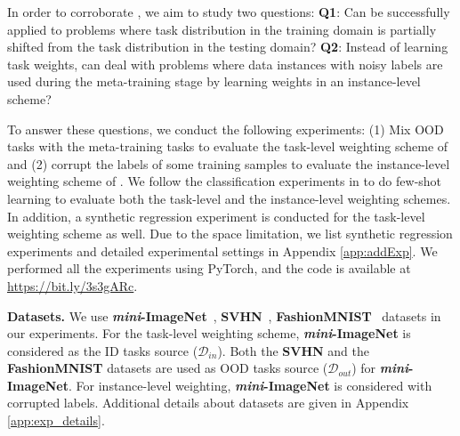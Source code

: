 In order to corroborate \sysname{}, we aim to study two questions:
\textbf{Q1}: Can \sysname{} be successfully applied to problems where task distribution in the training domain is partially shifted from the task distribution in the testing domain?
\textbf{Q2}: Instead of learning task weights, can \sysname{} deal with problems where data instances with noisy labels are used during the meta-training stage by learning weights in an instance-level scheme?


To answer these questions, we conduct the following experiments: (1) Mix OOD tasks with the meta-training tasks to evaluate the task-level weighting scheme of \sysname{} and (2) corrupt the labels of some training samples to evaluate the instance-level weighting scheme of \sysname{}. We follow the classification experiments in \cite{finn2017model} to do few-shot learning to evaluate both the task-level and the instance-level weighting schemes. In addition, a synthetic regression experiment is conducted for the task-level weighting scheme as well. Due to the space limitation, we list synthetic regression experiments and detailed experimental settings in Appendix \ref{app:addExp}. We performed all the experiments using PyTorch, and the code is available at \url{https://bit.ly/3s3gARc}. 


\textbf{Datasets.} We use \textbf{\textit{mini}-ImageNet}~\citep{ravi2016optimization}, \textbf{SVHN}~\citep{netzer2011reading}, \textbf{FashionMNIST}~\citep{xiao2017fashion} datasets in our experiments. For the task-level weighting scheme, \textbf{\textit{mini}-ImageNet} is considered as the ID tasks source ($\mathcal{D}_{in}$). Both the \textbf{SVHN} and the \textbf{FashionMNIST} datasets are used as OOD tasks source ($\mathcal{D}_{out}$) for \textbf{\textit{mini}-ImageNet}. For instance-level weighting, \textbf{\textit{mini}-ImageNet} is considered with corrupted labels. Additional details about datasets are given in Appendix \ref{app:exp_details}.

